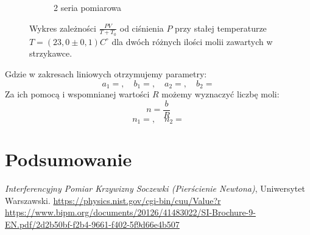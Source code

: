 \documentclass[12pt]{article}
\begin{document}
\begin{figure}[H]
\begin{subfigure}{0.47\textwidth}
        \caption{2 seria pomiarowa}
    \end{subfigure}
    \caption{Wykres zależności \(\frac{PV}{T + T_0}\) od ciśnienia \(P\) przy stałej temperaturze \(T = (23{,}0 \pm 0{,}1)C^\circ\) dla dwóch różnych ilości molii zawartych w strzykawce.}
    \label{fig:izotermic}
\end{figure}
Gdzie w zakresach liniowych otrzymujemy parametry:
\[
    a_1 = , \quad b_1 = , \quad a_2 = , \quad b_2 =
\]
Za ich pomocą i wspomnianej wartości \(R\) możemy wyznaczyć liczbę moli:
\[
    n = \frac{b}{R}
\]
\[
    n_1 = ,\quad n_2 = 
\]

\section{Podsumowanie}

\begin{thebibliography}{1}

	\emph{Interferencyjny Pomiar Krzywizny Soczewki (Pierścienie Newtona)}, Uniwersytet Warszawski.
    \url{https://physics.nist.gov/cgi-bin/cuu/Value?r}
    \url{https://www.bipm.org/documents/20126/41483022/SI-Brochure-9-EN.pdf/2d2b50bf-f2b4-9661-f402-5f9d66e4b507}

\end{thebibliography}


\newpage
\end{document}
